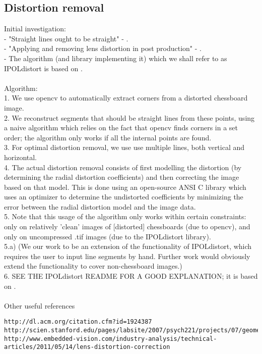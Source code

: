 \subsection{Distortion removal}
Initial investigation:\\
- "Straight lines ought to be straight" - \cite{straightlines} .\\
- "Applying and removing lens distortion in post production" - \cite{postproduction} .\\
- The algorithm (and library implementing it) which we shall refer to as IPOLdistort is based on \cite{algebraic-distortion} .\\\\
Algorithm:\\
1. We use opencv to automatically extract corners from a distorted chessboard image.\\
2. We reconstruct segments that should be straight lines from these points, using a naive algorithm which relies on the fact that opencv finds corners in a set order; the algorithm only works if all the internal points are found.\\
3. For optimal distortion removal, we use use multiple lines, both vertical and horizontal.\\
4. The actual distortion removal consists of first modelling the distortion (by determining the radial distortion coefficients) and then correcting the image based on that model. This is done using an open-source ANSI C library which uses an optimizer to determine the undistorted coefficients by minimizing the error between the radial distortion model and the image data.\\
5. Note that this usage of the algorithm only works within certain constraints: only on relatively 'clean' images of [distorted] chessboards (due to opencv), and only on uncompressed .tif images (due to the IPOLdistort library).\\
5.a) (We our work to be an extension of the functionality of IPOLdistort, which requires the user to input line segments by hand. Further work would obviously extend the functionality to cover non-chessboard images.)\\
6. SEE THE IPOLdistort README FOR A GOOD EXPLANATION; it is based on \cite{algebraic-distortion}.\\
\\
Other useful references\\
\begin{verbatim}
http://dl.acm.org/citation.cfm?id=1924387
http://scien.stanford.edu/pages/labsite/2007/psych221/projects/07/geometric_distortion/project.htm
http://www.embedded-vision.com/industry-analysis/technical-articles/2011/05/14/lens-distortion-correction
\end{verbatim}
